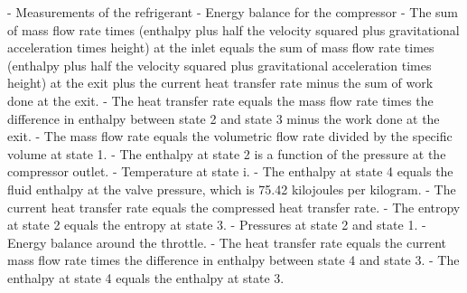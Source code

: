 - Measurements of the refrigerant
- Energy balance for the compressor
- The sum of mass flow rate times (enthalpy plus half the velocity squared plus gravitational acceleration times height) at the inlet equals the sum of mass flow rate times (enthalpy plus half the velocity squared plus gravitational acceleration times height) at the exit plus the current heat transfer rate minus the sum of work done at the exit.
- The heat transfer rate equals the mass flow rate times the difference in enthalpy between state 2 and state 3 minus the work done at the exit.
- The mass flow rate equals the volumetric flow rate divided by the specific volume at state 1.
- The enthalpy at state 2 is a function of the pressure at the compressor outlet.
- Temperature at state i.
- The enthalpy at state 4 equals the fluid enthalpy at the valve pressure, which is 75.42 kilojoules per kilogram.
- The current heat transfer rate equals the compressed heat transfer rate.
- The entropy at state 2 equals the entropy at state 3.
- Pressures at state 2 and state 1.
- Energy balance around the throttle.
- The heat transfer rate equals the current mass flow rate times the difference in enthalpy between state 4 and state 3.
- The enthalpy at state 4 equals the enthalpy at state 3.